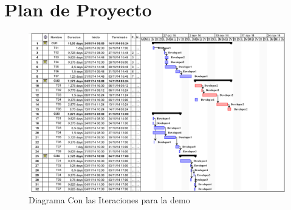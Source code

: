 
\section{Plan de Proyecto}

\begin{figure}[h!]
  \centering
  \includegraphics[width=1\textwidth]{plan.png}
  \caption{Diagrama Con las Iteraciones para la demo}
  \label{fig:clases4}
\end{figure}
